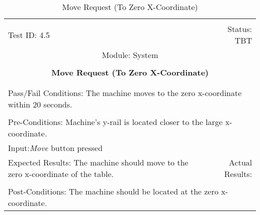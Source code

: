 \documentclass[titlepage]{article}
\begin{document}
\begin{center}%
\begin{table}
\begin{tabular}{|l r|}\hline&\\[-2mm]
	Test ID: 4.5	&Status: TBT\\[-3mm]
	\multicolumn{2}{|c|}{Module: System}\\&\\
	\multicolumn{2}{|c|}{\textbf{\large{Move Request (To Zero X-Coordinate)}}}\\&\\\hline&\\[-3mm]
	\multicolumn{2}{|p{\textwidth}|}{Pass/Fail Conditions: The machine moves to the zero x-coordinate within 20 seconds.}\\[1mm]\hline&\\[-3mm]
	\multicolumn{2}{|p{\textwidth}|}{Pre-Conditions: Machine's y-rail is located closer to the large x-coordinate.}\\[4mm]
	\multicolumn{2}{|p{\textwidth}|}{Input:\newline\textit{Move} button pressed}\\[2mm]\hline
	\multicolumn{1}{|p{0.49\textwidth}}{Expected Results: The machine should move to the zero x-coordinate of the table.}	&\multicolumn{1}{|p{0.45\textwidth}|}{Actual Results: }\\\hline&\\[-3mm]
	\multicolumn{2}{|p{\textwidth}|}{Post-Conditions: The machine should be located at the zero x-coordinate.}\\\hline
\end{tabular}
\caption{Move Request (To Zero X-Coordinate)}
\end{table}
\end{center}
\end{document}
